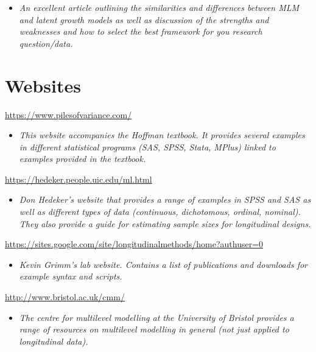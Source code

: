 \documentclass[
]{book}
\providecommand{\tightlist}{%
  \setlength{\itemsep}{0pt}\setlength{\parskip}{0pt}}
\begin{document}
\begin{itemize}
\tightlist
\item
  \emph{An excellent article outlining the similarities and differences between MLM and latent growth models as well as discussion of the strengths and weaknesses and how to select the best framework for you research question/data. }
\end{itemize}

\hypertarget{websites-2}{%
\section{Websites}\label{websites-2}}

\url{https://www.pilesofvariance.com/}

\begin{itemize}
\tightlist
\item
  \emph{This website accompanies the Hoffman textbook. It provides several examples in different statistical programs (SAS, SPSS, Stata, MPlus) linked to examples provided in the textbook. }
\end{itemize}

\url{https://hedeker.people.uic.edu/ml.html}

\begin{itemize}
\tightlist
\item
  \emph{Don Hedeker's website that provides a range of examples in SPSS and SAS as well as different types of data (continuous, dichotomous, ordinal, nominal). They also provide a guide for estimating sample sizes for longitudinal designs. }
\end{itemize}

\url{https://sites.google.com/site/longitudinalmethods/home?authuser=0}

\begin{itemize}
\tightlist
\item
  \emph{Kevin Grimm's lab website. Contains a list of publications and downloads for example syntax and scripts. }
\end{itemize}

\url{http://www.bristol.ac.uk/cmm/}

\begin{itemize}
\tightlist
\item
  \emph{The centre for multilevel modelling at the University of Bristol provides a range of resources on multilevel modelling in general (not just applied to longitudinal data). }
\end{itemize}
\end{document}
